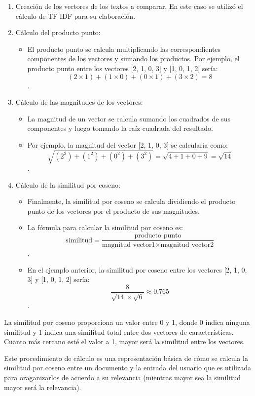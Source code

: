 \documentclass[a4paper, 12pt]{article}
\begin{document}
\begin{enumerate}
\item Creación de los vectores de los textos a comparar. En este caso se utilizó el cálculo de TF-IDF para su elaboración.
\item Cálculo del producto punto:
\begin{itemize}
 \item  El producto punto se calcula multiplicando las correspondientes componentes de los vectores y sumando los productos. Por ejemplo, el producto punto entre los vectores [2, 1, 0, 3] y [1, 0, 1, 2] sería: \[(2\times 1) + (1\times 0) + (0\times 1) + (3\times 2) = 8\].
\end{itemize}
\item  Cálculo de las magnitudes de los vectores:
\begin{itemize}
  \item  La magnitud de un vector se calcula sumando los cuadrados de sus componentes y luego tomando la raíz cuadrada del resultado.
  \item  Por ejemplo, la magnitud del vector [2, 1, 0, 3] se calcularía como:\[\sqrt{(2^2) + (1^2) + (0^2) + (3^2)} = \sqrt{4 + 1 + 0 + 9} = \sqrt{14}\].
\end{itemize}

\item Cálculo de la similitud por coseno:
\begin{itemize}
   \item Finalmente, la similitud por coseno se calcula dividiendo el producto punto de los vectores por el producto de sus magnitudes.
   \item La fórmula para calcular la similitud por coseno es: \[\text{similitud} = \frac{{\text{producto punto}}}{{\text{magnitud vector1} \times \text{magnitud vector2}}}\].
  \item En el ejemplo anterior, la similitud por coseno entre los vectores [2, 1, 0, 3] y [1, 0, 1, 2] sería: \[\frac{8}{{\sqrt{14} \times \sqrt{6}}} \approx 0.765\].
\end{itemize}
\end{enumerate}
La similitud por coseno proporciona un valor entre 0 y 1, donde 0 indica ninguna similitud y 1 indica una similitud total entre dos vectores de características. Cuanto más cercano esté el valor a 1, mayor será la similitud entre los vectores.

Este procedimiento de cálculo es una representación básica de cómo se calcula la similitud por coseno entre un documento y la entrada del usuario que es utilizada para oraganizarlos de acuerdo a su relevancia (mientras mayor sea la similitud mayor será la relevancia).
\end{document}
